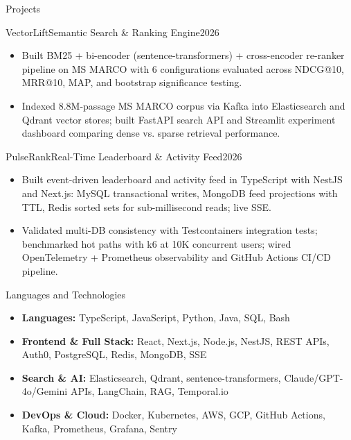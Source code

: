\documentclass[]{mcdowellcv}
\begin{document}
\begin{cvsection}{Projects}
  \begin{cvsubsection}{VectorLift}{Semantic Search \& Ranking Engine}{2026}
    \begin{itemize}
      \item Built BM25 + bi-encoder (sentence-transformers) + cross-encoder re-ranker pipeline on MS MARCO with 6 configurations evaluated across NDCG@10, MRR@10, MAP, and bootstrap significance testing.
      \item Indexed 8.8M-passage MS MARCO corpus via Kafka into Elasticsearch and Qdrant vector stores; built FastAPI search API and Streamlit experiment dashboard comparing dense vs. sparse retrieval performance.
    \end{itemize}
    \vspace{-1.5pt}
  \end{cvsubsection}

  \begin{cvsubsection}{PulseRank}{Real-Time Leaderboard \& Activity Feed}{2026}
    \begin{itemize}
      \item Built event-driven leaderboard and activity feed in TypeScript with NestJS and Next.js: MySQL transactional writes, MongoDB feed projections with TTL, Redis sorted sets for sub-millisecond reads; live SSE.
      \item Validated multi-DB consistency with Testcontainers integration tests; benchmarked hot paths with k6 at 10K concurrent users; wired OpenTelemetry + Prometheus observability and GitHub Actions CI/CD pipeline.
    \end{itemize}
  \end{cvsubsection}
\end{cvsection}

\begin{cvsection}{Languages and Technologies}
  \begin{cvsubsection}{}{}{}
    \begin{itemize}
      \item \textbf{Languages:} TypeScript, JavaScript, Python, Java, SQL, Bash
      \item \textbf{Frontend \& Full Stack:} React, Next.js, Node.js, NestJS, REST APIs, Auth0, PostgreSQL, Redis, MongoDB, SSE
      \item \textbf{Search \& AI:} Elasticsearch, Qdrant, sentence-transformers, Claude/GPT-4o/Gemini APIs, LangChain, RAG, Temporal.io
      \item \textbf{DevOps \& Cloud:} Docker, Kubernetes, AWS, GCP, GitHub Actions, Kafka, Prometheus, Grafana, Sentry
    \end{itemize}
  \end{cvsubsection}
\end{cvsection}
\end{document}
